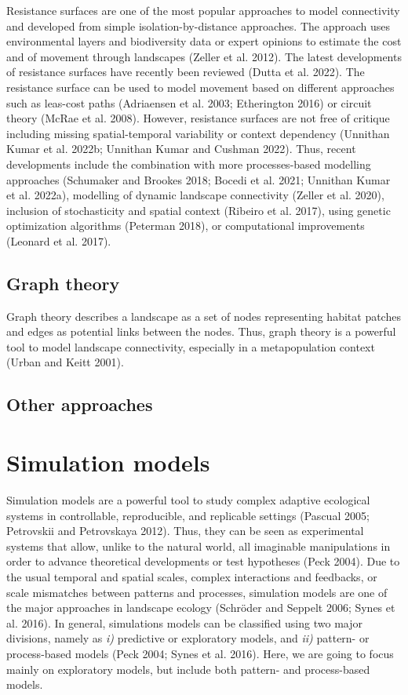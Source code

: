\documentclass[
  10pt,
  a4paperpaper,
]{article}
\begin{document}
Resistance surfaces are one of the most popular approaches to model
connectivity and developed from simple isolation-by-distance approaches.
The approach uses environmental layers and biodiversity data or expert
opinions to estimate the cost and of movement through landscapes (Zeller
et al. 2012). The latest developments of resistance surfaces have
recently been reviewed (Dutta et al. 2022). The resistance surface can
be used to model movement based on different approaches such as
leas-cost paths (Adriaensen et al. 2003; Etherington 2016) or circuit
theory (McRae et al. 2008). However, resistance surfaces are not free of
critique including missing spatial-temporal variability or context
dependency (Unnithan Kumar et al. 2022b; Unnithan Kumar and Cushman
2022). Thus, recent developments include the combination with more
processes-based modelling approaches (Schumaker and Brookes 2018; Bocedi
et al. 2021; Unnithan Kumar et al. 2022a), modelling of dynamic
landscape connectivity (Zeller et al. 2020), inclusion of stochasticity
and spatial context (Ribeiro et al. 2017), using genetic optimization
algorithms (Peterman 2018), or computational improvements (Leonard et
al. 2017).

\subsection{Graph theory}\label{graph-theory}

Graph theory describes a landscape as a set of nodes representing
habitat patches and edges as potential links between the nodes. Thus,
graph theory is a powerful tool to model landscape connectivity,
especially in a metapopulation context (Urban and Keitt 2001).

\subsection{Other approaches}\label{other-approaches}

\section{Simulation models}\label{simulation-models}

Simulation models are a powerful tool to study complex adaptive
ecological systems in controllable, reproducible, and replicable
settings (Pascual 2005; Petrovskii and Petrovskaya 2012). Thus, they can
be seen as experimental systems that allow, unlike to the natural world,
all imaginable manipulations in order to advance theoretical
developments or test hypotheses (Peck 2004). Due to the usual temporal
and spatial scales, complex interactions and feedbacks, or scale
mismatches between patterns and processes, simulation models are one of
the major approaches in landscape ecology (Schröder and Seppelt 2006;
Synes et al. 2016). In general, simulations models can be classified
using two major divisions, namely as \emph{i)} predictive or exploratory
models, and \emph{ii)} pattern- or process-based models (Peck 2004;
Synes et al. 2016). Here, we are going to focus mainly on exploratory
models, but include both pattern- and process-based models.
\end{document}
